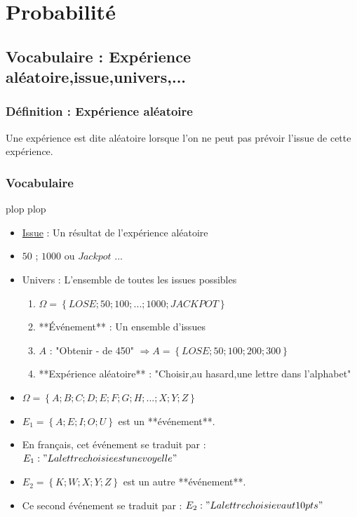 \chapter{Probabilité}
\section{Vocabulaire : Expérience aléatoire,issue,univers,...}
\lipsum[2]
\subsection{Définition : Expérience aléatoire}

Une expérience est dite aléatoire lorsque l'on ne peut pas prévoir l'issue de cette expérience.

\subsection{Vocabulaire}

plop plop

\lipsum[3]
\begin{itemize}
	\item \ul{Issue} : Un résultat de l'expérience aléatoire
	\item $50$ ; $1000$ ou ${Jackpot}$ ...
	\item Univers : L'ensemble de toutes les issues possibles
	      \begin{enumerate}
		      \item $\Omega=\left\{{LOSE} ; 50 ; 100 ;... ;1000 ;{JACKPOT}\right\}$
		      \item **Événement** : Un ensemble d'issues
		      \item $A$ : "Obtenir - de 450\eur" $\Rightarrow A=\left\{{LOSE} ;50 ;100 ;200 ;300\right\}$
		      \item **Expérience aléatoire** : "Choisir,au hasard,une lettre dans l'alphabet"
	      \end{enumerate}
	\item $\Omega =\left\{A;B;C;D;E;F;G;H;...;X;Y;Z\right\}$
	\item $E_1=\left\{A;E;I;O;U\right\}$ est un **événement**.
	\item En français, cet événement se traduit par : $E_1: {"La lettre choisie est une voyelle"}$
	\item $E_2=\left\{K;W;X;Y;Z\right\}$ est un autre **événement**.
	\item Ce second événement se traduit par : $E_2: {"La lettre choisie vaut 10 pts"}$
\end{itemize}

